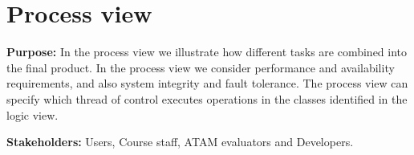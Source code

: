     
    
    
    \section{Process view}
    \noindent\textbf{Purpose:} In the process view we illustrate how different tasks are combined into the final product. In the process view we consider performance and availability requirements, and also system integrity and fault tolerance.
    The process view can specify which thread of control executes operations in the classes identified in the logic view. 

    \noindent\textbf{Stakeholders:} Users, Course staff, ATAM evaluators and Developers.
    

